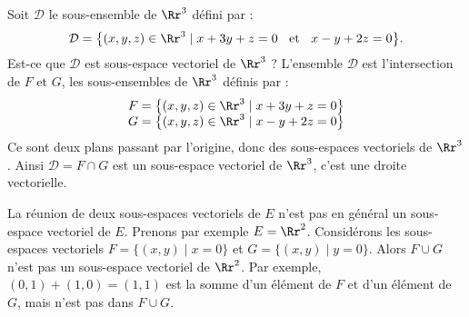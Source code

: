 \documentclass[class=report,crop=false]{standalone}
\begin{document}
\begin{exemple}
Soit $\mathcal{D}$ le sous-ensemble de $\Rr^3$ défini par :
$$\mathcal{D}= \big\{ (x,y,z) \in \Rr^3\mid x+3y+z =0 \;\; \text{ et } \;\; x-y+2z=0 \big\}.$$
Est-ce que $\mathcal{D}$ est sous-espace vectoriel de $\Rr^3$ ?
L'ensemble $\mathcal{D}$ est l'intersection de $F$ et $G$,
les sous-ensembles de $\Rr^3$ définis par :
$$\begin{array}{l}
F=\big\{ (x,y,z) \in \Rr^3\mid x+3y+z =0 \big\}\\
G=\big\{ (x,y,z) \in \Rr^3 \mid x-y+2z =0 \big\}
\end{array}$$
Ce sont deux plans passant par l'origine, donc des sous-espaces vectoriels de $\Rr^3$.
Ainsi $\mathcal{D} =F \cap G$ est un sous-espace vectoriel de $\Rr^3$, c'est une droite vectorielle.
\end{exemple}



\begin{remarque*}
La réunion de deux sous-espaces vectoriels de $E$ n'est pas en général
un sous-espace vectoriel de $E$.
Prenons par exemple $E=\Rr^2$. Considérons les sous-espaces vectoriels
$F=\big\{(x,y)\mid x=0\big\}$ et $G=\big\{(x,y)\mid y=0\big\}$.
Alors $F\cup G$ n'est pas un sous-espace vectoriel de $\Rr^2$.
Par exemple, $(0,1)+(1,0)=(1,1)$ est la somme d'un élément de $F$
et d'un élément de $G$, mais n'est pas dans $F\cup G$.

\end{remarque*}




\end{document}
